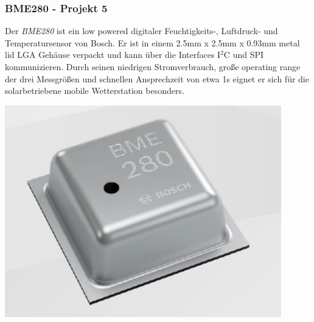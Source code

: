 \subsubsection{BME280 - Projekt 5}
\label{BME280}
{\begin{minipage}[b][6cm][t]{0.55\textwidth}
Der \textit{BME280} ist ein low powered digitaler Feuchtigkeits-, Luftdruck- und Temperatursensor von Bosch. Er ist in einem 2.5mm x 2.5mm x 0.93mm metal lid LGA Gehäuse verpackt und kann über die Interfaces I$^{2}$C und SPI kommunizieren. Durch seinen niedrigen Stromverbrauch, große operating range der drei Messgrößen und schnellen Ansprechzeit von etwa 1s eignet er sich für die solarbetriebene mobile Wetterstation besonders. \cite{Bosch2019}\\
\end{minipage}}
{\begin{minipage}[b][6cm][t]{0.44\textwidth}
\centering
\includegraphics[width=0.9\textwidth]{graphics/bme280/bme280.PNG}
\label{fig:bme280}
\end{minipage}}

